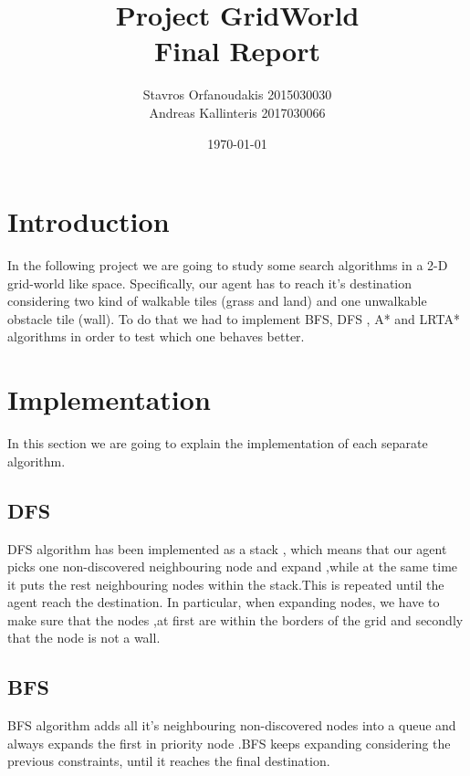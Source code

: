 \documentclass{article}
\title{\textbf{Project GridWorld\\Final Report}}
\author{Stavros Orfanoudakis 2015030030 \\ Andreas Kallinteris 	2017030066}
\date{\today}
\begin{document}
\maketitle

\section{Introduction}
In the following project we are going to study some search algorithms in a 2-D grid-world like space. Specifically, our agent has to reach it's destination considering two kind of walkable tiles (grass and land) and one unwalkable obstacle tile (wall). To do that we had to implement BFS, DFS , A* and LRTA* algorithms in order to test which one behaves better.

\section{Implementation}
In this section we are going to explain the implementation of each separate algorithm.

\subsection{DFS}
    DFS algorithm has been implemented as a stack , which means that our agent picks one non-discovered neighbouring node and expand ,while at the same time it puts the rest neighbouring nodes within the stack.This is repeated until the agent reach the destination. In particular, when expanding nodes, we have to make sure that the nodes ,at first are within the borders of the grid and secondly that the node is not a wall.
\subsection{BFS}
    BFS algorithm adds all it's neighbouring non-discovered nodes into a queue and always expands the first in priority node .BFS keeps expanding considering the previous constraints, until it reaches the final destination.
\end{document}
